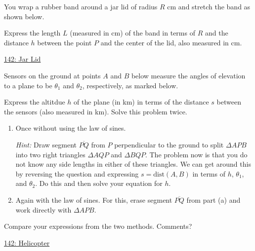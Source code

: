 \documentclass{ximera}
\begin{document}
\begin{question} \label{QdfRDEfeERER}
You wrap a rubber band around a jar lid of radius $R$ cm and stretch the band as shown below.

Express the length $L$ (measured in cm) of the band in terms of $R$ and the distance $h$ between the point $P$ and the center of the lid, also measured in cm.


\begin{onlineOnly}
    \begin{center}
\end{center}
\end{onlineOnly}

\href{https://www.desmos.com/calculator/wz5qiyj4od}{142: Jar Lid}

\end{question}


\begin{question} \label{Q454ddtgHHERER}
Sensors on the ground at points $A$ and $B$ below measure the angles of elevation to a plane to be $\theta_1$ and $\theta_2$, respectively, as marked below.

Express the altitdue $h$ of the plane (in km) in terms of the distance $s$ between the sensors (also measured in km). Solve this problem twice.

\begin{enumerate}
\item Once without using the law of sines. 

\emph{Hint:} Draw segment $\overline{PQ}$ from $P$ perpendicular to the ground to split $\Delta APB$ into two right triangles $\Delta AQP$ and $\Delta BQP$. The problem now is that you do not know any side lengths in either of these triangles. We can get around this by reversing the question and expressing $s = \text{dist}(A,B)$ in terms of $h$, $\theta_1$, and $\theta_2$. Do this and then solve your equation for $h$.

\item Again with the law of sines. For this, erase segment $\overline{PQ}$ from part (a) and work directly with $\Delta APB$.
\end{enumerate}

Compare your expressions from the two methods. Comments?


\begin{onlineOnly}
    \begin{center}
\end{center}
\end{onlineOnly}

\href{https://www.desmos.com/calculator/zbktegkke4}{142: Helicopter}

\end{question}
\end{document}
